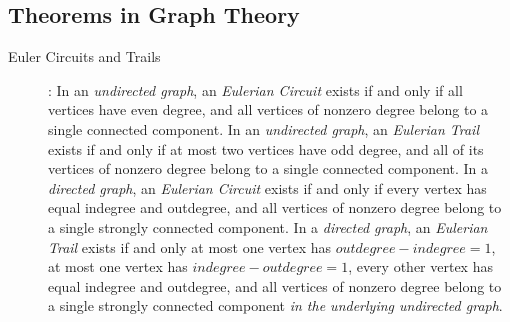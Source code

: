 \documentclass[
	a4paper,
	landscape,
	10pt,
	article
]{article}
\newcommand{\entry}[5]{
	\subsection{#1}
	#2
	\ifthenelse{\equal{#4}{}}{}{\noindent\textbf{Complexity:} #4}
	\ifthenelse{\equal{#5}{}}{}{\noindent\textbf{Dependencies:} #5}
	\ifthenelse{\equal{#3}{}}{}{}
}
\begin{document}

\subsection{Theorems in Graph Theory}
\begin{description}






	\item[Euler Circuits and Trails]:
		In an \textit{undirected graph}, an \textit{Eulerian Circuit} exists if and only if all vertices have even degree, and all vertices of nonzero degree belong to a single connected component. In an \textit{undirected graph}, an \textit{Eulerian Trail} exists if and only if at most two vertices have odd degree, and all of its vertices of nonzero degree belong to a single connected component. In a \textit{directed graph}, an \textit{Eulerian Circuit} exists if and only if every vertex has equal indegree and outdegree, and all vertices of nonzero degree belong to a single strongly connected component. In a \textit{directed graph}, an \textit{Eulerian Trail} exists if and only at most one vertex has $outdegree - indegree = 1$, at most one vertex has $indegree - outdegree = 1$, every other vertex has equal indegree and outdegree, and all vertices of nonzero degree belong to a single strongly connected component \textit{in the underlying undirected graph}.
\end{description}
\end{document}
